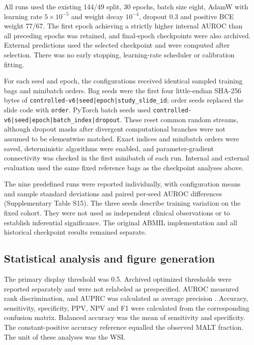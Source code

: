 All runs used the existing 144/49 split, 30 epochs, batch size eight, AdamW with learning rate $5\times10^{-5}$ and weight decay $10^{-4}$, dropout 0.3 and positive BCE weight 77/67. The first epoch achieving a strictly higher internal AUROC than all preceding epochs was retained, and final-epoch checkpoints were also archived. External predictions used the selected checkpoint and were computed after selection. There was no early stopping, learning-rate scheduler or calibration fitting.

For each seed and epoch, the configurations received identical sampled training bags and minibatch orders. Bag seeds were the first four little-endian SHA-256 bytes of \texttt{controlled-v6|\allowbreak{}seed|\allowbreak{}epoch|\allowbreak{}study\_slide\_id}; order seeds replaced the slide code with \texttt{order}. PyTorch batch seeds used \texttt{controlled-v6|\allowbreak{}seed|\allowbreak{}epoch|\allowbreak{}batch\_index|\allowbreak{}dropout}. These reset common random streams, although dropout masks after divergent computational branches were not assumed to be elementwise matched. Exact indices and minibatch orders were saved, deterministic algorithms were enabled, and parameter-gradient connectivity was checked in the first minibatch of each run. Internal and external evaluation used the same fixed reference bags as the checkpoint analyses above.

The nine predefined runs were reported individually, with configuration means and sample standard deviations and paired per-seed AUROC differences (Supplementary Table S15). The three seeds describe training variation on the fixed cohort. They were not used as independent clinical observations or to establish inferential significance. The original ABMIL implementation and all historical checkpoint results remained separate.


\subsection{Statistical analysis and figure generation}

The primary display threshold was 0.5. Archived optimized thresholds were reported separately and were not relabeled as prespecified. AUROC measured rank discrimination, and AUPRC was calculated as average precision \citep{ref18}. Accuracy, sensitivity, specificity, PPV, NPV and F1 were calculated from the corresponding confusion matrix. Balanced accuracy was the mean of sensitivity and specificity. The constant-positive accuracy reference equalled the observed MALT fraction. The unit of these analyses was the WSI.

